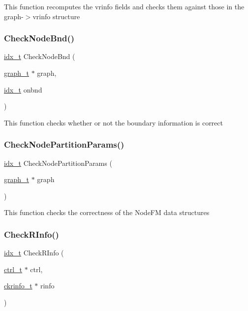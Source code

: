 This function recomputes the vrinfo fields and checks them against those in the graph-\/$>$vrinfo structure \mbox{\label{a00882_a1dc55b7020a40a70e39a3e179055c04f}} 
\subsubsection{\texorpdfstring{Check\+Node\+Bnd()}{CheckNodeBnd()}}
{\footnotesize\ttfamily \hyperlink{a00876_aaa5262be3e700770163401acb0150f52}{idx\+\_\+t} Check\+Node\+Bnd (\begin{DoxyParamCaption}\item[{\hyperlink{a00734}{graph\+\_\+t} $\ast$}]{graph,  }\item[{\hyperlink{a00876_aaa5262be3e700770163401acb0150f52}{idx\+\_\+t}}]{onbnd }\end{DoxyParamCaption})}

This function checks whether or not the boundary information is correct \mbox{\label{a00882_a519cbaf8cac5493b2b1ef28e595ac7b7}} 
\subsubsection{\texorpdfstring{Check\+Node\+Partition\+Params()}{CheckNodePartitionParams()}}
{\footnotesize\ttfamily \hyperlink{a00876_aaa5262be3e700770163401acb0150f52}{idx\+\_\+t} Check\+Node\+Partition\+Params (\begin{DoxyParamCaption}\item[{\hyperlink{a00734}{graph\+\_\+t} $\ast$}]{graph }\end{DoxyParamCaption})}

This function checks the correctness of the Node\+FM data structures \mbox{\label{a00882_adb0cfc48ae3464b6fab963903edc0420}} 
\subsubsection{\texorpdfstring{Check\+R\+Info()}{CheckRInfo()}}
{\footnotesize\ttfamily \hyperlink{a00876_aaa5262be3e700770163401acb0150f52}{idx\+\_\+t} Check\+R\+Info (\begin{DoxyParamCaption}\item[{\hyperlink{a00742}{ctrl\+\_\+t} $\ast$}]{ctrl,  }\item[{\hyperlink{a00718}{ckrinfo\+\_\+t} $\ast$}]{rinfo }\end{DoxyParamCaption})}


